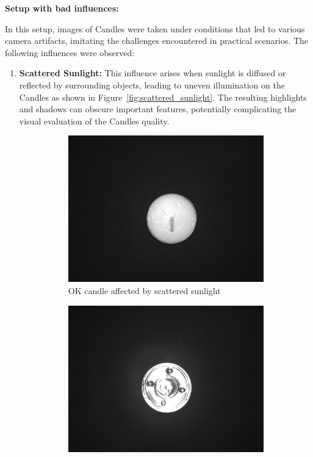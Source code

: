 \documentclass[12pt,DIV14,BCOR12mm,a4paper,footinclude=false,headinclude,parskip=half-,twoside,openright,cleardoublepage=empty,toc=index,bibliography=totoc,listof=totoc]{scrreprt}
\numberwithin{equation}{chapter}
\begin{document}
\textbf{Setup with bad influences:}

In this setup, images of Candles were taken under conditions that led to various camera artifacts, imitating the challenges encountered in practical scenarios. The following influences were observed:

\begin{enumerate}
    \item \textbf{Scattered Sunlight:} This influence arises when sunlight is diffused or reflected by surrounding objects, leading to uneven illumination on the Candles as shown in Figure~\ref{fig:scattered_sunlight}. The resulting highlights and shadows can obscure important features, potentially complicating the visual evaluation of the Candles quality.

    \begin{figure}
        \centering
        \begin{subfigure}[b]{0.45\textwidth}
            \centering
            \includegraphics[scale=0.15]{../media/Candles-influence-sunlight-OK.png}
            \caption{OK candle affected by scattered sunlight}
        \end{subfigure}
        \hfill
        \begin{subfigure}[b]{0.45\textwidth}
            \centering
            \includegraphics[scale=0.15]{../media/Candles-influence-sunlight-NOK.png}

\end{subfigure}
\end{figure}
\end{enumerate}
\end{document}
